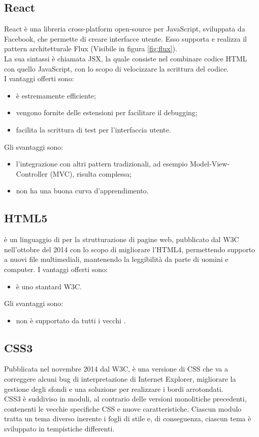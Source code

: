 \subsection{React}
React è una libreria cross-platform open-source per JavaScript, sviluppata da Facebook, che permette di creare interfacce utente. Esso supporta e realizza il pattern architetturale Flux (Visibile in figura \ref{fig:flux}). \\
La sua sintassi è chiamata JSX, la quale consiste nel combinare codice HTML con quello JavaScript, con lo scopo di velocizzare la scrittura del codice.\\
I vantaggi offerti sono:
\begin{itemize}
	\item è estremamente efficiente;
	\item vengono fornite delle estensioni per facilitare il debugging;
	\item facilita la scrittura di test per l'interfaccia utente.
\end{itemize}
Gli svantaggi sono:
\begin{itemize}
	\item l'integrazione con altri pattern tradizionali, ad esempio Model-View-Controller (MVC), risulta complessa;
	\item non ha una buona curva d'apprendimento.
\end{itemize}
\subsection{HTML5}
 è un linguaggio di  per la strutturazione di pagine web, pubblicato dal W3C nell’ottobre del 2014 con lo scopo di migliorare l’HTML4, permettendo supporto a nuovi file multimediali, mantenendo la leggibilità da parte di uomini e computer.
I vantaggi offerti sono:
\begin{itemize}
	\item è uno stantard W3C.
\end{itemize}
Gli svantaggi sono:
\begin{itemize}
	\item non è supportato da tutti i vecchi .
\end{itemize}
\subsection{CSS3}
Pubblicata nel novembre 2014 dal W3C,  è una versione di CSS che va a correggere alcuni bug di interpretazione di Internet Explorer, migliorare la gestione degli sfondi e una soluzione per realizzare i bordi arrotondati.\\
CSS3 è suddiviso in moduli, al contrario delle versioni monolitiche precedenti, contenenti le vecchie specifiche CSS e nuove caratteristiche. Ciascun modulo tratta un tema diverso inerente i fogli di stile e, di conseguenza, ciascun tema è sviluppato in tempistiche differenti.
